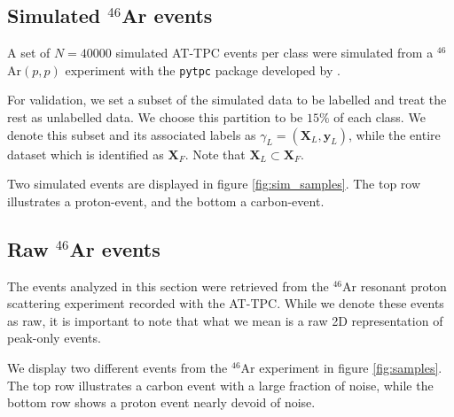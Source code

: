 \documentclass[review,number,sort&compress]{elsarticle}
\begin{document}
\subsection{Simulated \texorpdfstring{${}^{46}$Ar}{46Ar}  events}\label{sec:data_sim}

A set of $N=40000$ simulated AT-TPC events per class were simulated from a ${}^{46}$Ar$(p, p)$ experiment with the \lstinline{pytpc} package developed by \citet{Bradt2017a}. %

For validation, we set a subset of the simulated data to be labelled and treat the rest as unlabelled data. We choose this partition to be $15\%$ of each class. We denote this subset and its associated labels as $\gamma_L=(\boldsymbol{X}_L, \boldsymbol{y}_L)$, while the entire dataset which is identified as $\boldsymbol{X}_F$. Note that $\boldsymbol{X}_L \subset \boldsymbol{X}_F$.

Two simulated events are displayed in figure \ref{fig:sim_samples}. The top row illustrates a proton-event, and the bottom a carbon-event. 



\subsection{Raw \texorpdfstring{${}^{46}$Ar}{46Ar}  events}\label{sec:data_real}

The events analyzed in this section were retrieved from the ${}^{46}$Ar resonant proton scattering experiment recorded with the AT-TPC. 
While we denote these events as raw, it is important to note that what we mean is a raw 2D representation of peak-only events.


We display two different events from the ${}^{46}$Ar experiment in figure \ref{fig:samples}. The top row illustrates a carbon event with a large fraction of noise, while the bottom row shows a proton event nearly devoid of noise.
\end{document}
